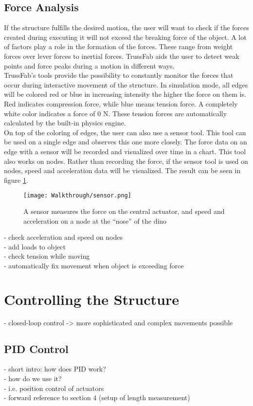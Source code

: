 \subsection{Force Analysis}
If the structure fulfills the desired motion, the user will want to check if the forces created during executing it will not exceed the breaking force of the object. A lot of factors play a role in the formation of the forces. These range from weight forces over lever forces to inertial forces. TrussFab aids the user to detect weak points and force peaks during a motion in different ways.\\
TrussFab's tools provide the possibility to constantly monitor the forces that occur during interactive movement of the structure. In simulation mode, all edges will be colored red or blue in increasing intensity the higher the force on them is. Red indicates compression force, while blue means tension force. A completely white color indicates a force of 0 N. These tension forces are automatically calculated by the built-in physics engine.\\
On top of the coloring of edges, the user can also use a sensor tool. This tool can be used on a single edge and observes this one more closely. The force data on an edge with a sensor will be recorded and visualized over time in a chart. This tool also works on nodes. Rather than recording the force, if the sensor tool is used on nodes, speed and acceleration data will be visualized. The result can be seen in figure \ref{fig:sensor}.\\
\begin{figure}[h!]
    \texttt{[image: Walkthrough/sensor.png]}
    \centering
    \caption{A sensor measures the force on the central actuator, and speed and acceleration on a node at the ``nose'' of the dino}
    \label{fig:sensor}
\end{figure}
- check acceleration and speed on nodes\\
- add loads to object\\
- check tension while moving\\
- automatically fix movement when object is exceeding force\\
\section{Controlling the Structure}
- closed-loop control -> more sophisticated and complex movements possible\\
\subsection{PID Control}
- short intro: how does PID work?\\
- how do we use it?\\
- i.e. position control of actuators\\
- forward reference to section 4 (setup of length measurement)\\
